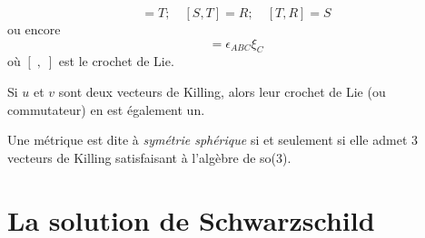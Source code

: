 \begin{equation}
    [R,S]  = T ; \quad [S,T]  = R ; \quad [T,R]  = S
\end{equation}
ou encore 
\begin{equation}
    [\xi_A,\xi_B] = \epsilon_{ABC} \xi_C
\end{equation}
où $[\; , \; ]$ est le crochet de Lie.
\begin{rmk}
    Si $u$ et $v$ sont deux vecteurs de Killing, alors leur crochet de Lie (ou commutateur) en est également un.
\end{rmk}
\begin{theoremframe}
    \begin{defi}
        Une métrique est dite à \emph{symétrie sphérique} si et seulement si elle admet 3 vecteurs de Killing satisfaisant à l'algèbre de so(3).
    \end{defi}
\end{theoremframe}
\section{La solution de Schwarzschild}
